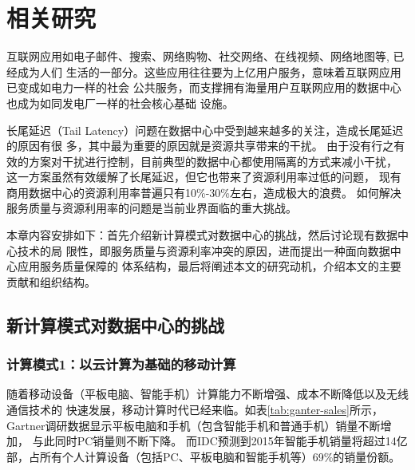 

\chapter{相关研究}
\label{chap:related}

互联网应用如电子邮件、搜索、网络购物、社交网络、在线视频、网络地图等, 已经成为人们
生活的一部分。这些应用往往要为上亿用户服务，意味着互联网应用已变成如电力一样的社会
公共服务，而支撑拥有海量用户互联网应用的数据中心也成为如同发电厂一样的社会核心基础
设施。

长尾延迟（Tail Latency）问题在数据中心中受到越来越多的关注，造成长尾延迟的原因有很
多，其中最为重要的原因就是资源共享带来的干扰。
由于没有行之有效的方案对干扰进行控制，目前典型的数据中心都使用隔离的方式来减小干扰，
这一方案虽然有效缓解了长尾延迟，但它也带来了资源利用率过低的问题，
现有商用数据中心的资源利用率普遍只有10\%-30\%左右，造成极大的浪费。
如何解决服务质量与资源利用率的问题是当前业界面临的重大挑战。

本章内容安排如下：首先介绍新计算模式对数据中心的挑战，然后讨论现有数据中心技术的局
限性，即服务质量与资源利率冲突的原因，进而提出一种面向数据中心应用服务质量保障的
体系结构，最后将阐述本文的研究动机，介绍本文的主要贡献和组织结构。

%

\section{新计算模式对数据中心的挑战}

\subsection*{计算模式1：以云计算为基础的移动计算}

随着移动设备（平板电脑、智能手机）计算能力不断增强、成本不断降低以及无线通信技术的
快速发展，移动计算时代已经来临。如表\ref{tab:ganter-sales}所示，
Gartner调研数据显示平板电脑和手机（包含智能手机和普通手机）销量不断增加，
与此同时PC销量则不断下降。
而IDC预测到2015年智能手机销量将超过14亿部，占所有个人计算设备（包括PC、平板电脑和智能手机等）69\%的销量份额。

